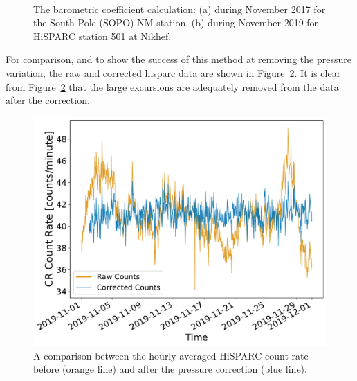 \begin{figure}[ht!]
	\centering
	 \\
	
	\caption{The barometric coefficient calculation: (a) during November 2017 for the South Pole (SOPO) NM station, (b) during November 2019 for HiSPARC station 501 at Nikhef.}
	\label{fig:barometric_fit}
\end{figure}

For comparison, and to show the success of this method at removing the pressure variation, the raw and corrected \gls{hisparc} data are shown in Figure~\ref{fig:HS_P_corr}. It is clear from Figure~\ref{fig:HS_P_corr} that the large excursions are adequately removed from the data after the correction.

\begin{figure}[ht!]
	\centering
	\includegraphics[width=0.65\columnwidth]{501_raw_vs_corrected.pdf}
	\caption{A comparison between the hourly-averaged HiSPARC count rate before (orange line) and after the pressure correction (blue line).}
	\label{fig:HS_P_corr}
\end{figure}


